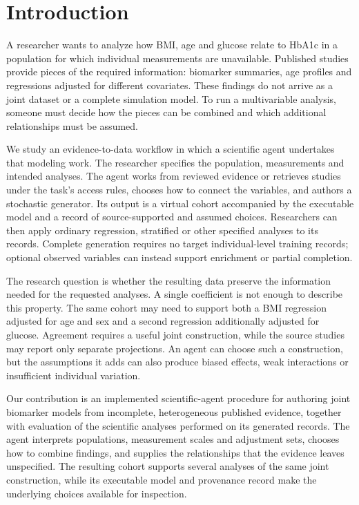 \documentclass[11pt,letterpaper]{article}
\begin{document}
\section{Introduction}

A researcher wants to analyze how BMI, age and glucose relate to HbA1c in a population for which individual measurements are unavailable. Published studies provide pieces of the required information: biomarker summaries, age profiles and regressions adjusted for different covariates. These findings do not arrive as a joint dataset or a complete simulation model. To run a multivariable analysis, someone must decide how the pieces can be combined and which additional relationships must be assumed.


We study an evidence-to-data workflow in which a scientific agent undertakes that modeling work. The researcher specifies the population, measurements and intended analyses. The agent works from reviewed evidence or retrieves studies under the task's access rules, chooses how to connect the variables, and authors a stochastic generator. Its output is a virtual cohort accompanied by the executable model and a record of source-supported and assumed choices. Researchers can then apply ordinary regression, stratified or other specified analyses to its records. Complete generation requires no target individual-level training records; optional observed variables can instead support enrichment or partial completion.


The research question is whether the resulting data preserve the information needed for the requested analyses. A single coefficient is not enough to describe this property. The same cohort may need to support both a BMI regression adjusted for age and sex and a second regression additionally adjusted for glucose. Agreement requires a useful joint construction, while the source studies may report only separate projections. An agent can choose such a construction, but the assumptions it adds can also produce biased effects, weak interactions or insufficient individual variation.


Our contribution is an implemented scientific-agent procedure for authoring joint biomarker models from incomplete, heterogeneous published evidence, together with evaluation of the scientific analyses performed on its generated records. The agent interprets populations, measurement scales and adjustment sets, chooses how to combine findings, and supplies the relationships that the evidence leaves unspecified. The resulting cohort supports several analyses of the same joint construction, while its executable model and provenance record make the underlying choices available for inspection.
\end{document}
